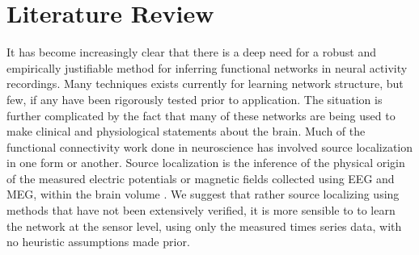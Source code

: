 \documentclass[11pt]{article}
\begin{document}
\section{Literature Review}
It has become increasingly clear that there is a deep need for a robust and empirically justifiable method for inferring functional networks in neural activity recordings. Many techniques exists currently for learning network structure, but few, if any have been rigorously tested prior to application. The situation is further complicated by the fact that many of these networks are being used to make clinical and physiological statements about the brain. Much of the functional connectivity work done in neuroscience has involved source localization in one form or another. Source localization is the inference of the physical origin of the measured electric potentials or magnetic fields collected using EEG and MEG, within the brain volume \citep{friston}. We suggest that rather source localizing using methods that have not been extensively verified, it is more sensible to to learn the network at the sensor level, using only the measured times series data, with no heuristic assumptions made prior. 
\end{document}
